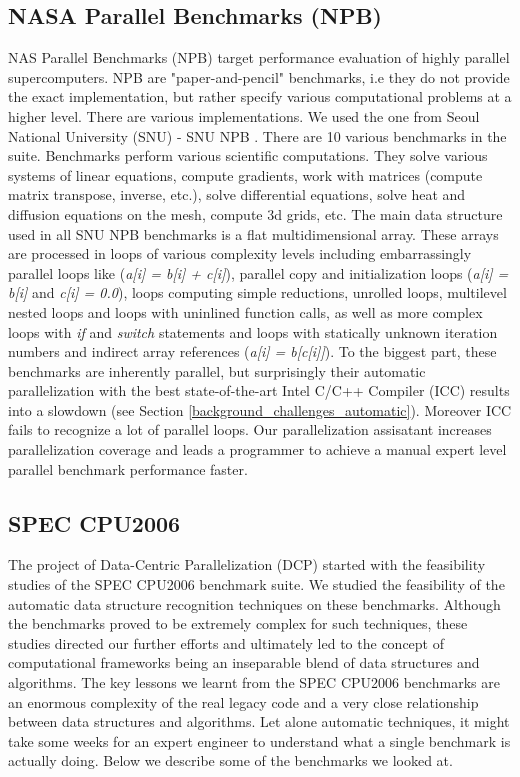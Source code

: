\subsection{NASA Parallel Benchmarks (NPB)}
\label{background_benchmarks_npb}
\quad NAS Parallel Benchmarks (NPB) \cite{nasa-parallel-benchmarks} target performance evaluation of highly parallel supercomputers. NPB are "paper-and-pencil" benchmarks, i.e they do not provide the exact implementation, but rather specify various computational problems at a higher level. There are various implementations. We used the one from Seoul National University (SNU) - SNU NPB \cite{snu-npb-benchmarks}.\newline\null
\quad There are 10 various benchmarks in the suite. Benchmarks perform various scientific computations. They solve various systems of linear equations, compute gradients, work with matrices (compute matrix transpose, inverse, etc.), solve differential equations, solve heat and diffusion equations on the mesh, compute 3d grids, etc. The main data structure used in all SNU NPB benchmarks is a flat multidimensional array. These arrays are processed in loops of various complexity levels including embarrassingly parallel loops like (\textit{a[i] = b[i] + c[i]}), parallel copy and initialization loops (\textit{a[i] = b[i]} and \textit{c[i] = 0.0}), loops computing simple reductions, unrolled loops, multilevel nested loops and loops with uninlined function calls, as well as more complex loops with \textit{if} and \textit{switch} statements and loops with statically unknown iteration numbers and indirect array references (\textit{a[i] = b[c[i]]}).\newline\null
\quad To the biggest part, these benchmarks are inherently parallel, but surprisingly their automatic parallelization with the best state-of-the-art Intel C/C++ Compiler (ICC) \cite{icc-compiler} results into a slowdown (see Section \ref{background_challenges_automatic}). Moreover ICC fails to recognize a lot of parallel loops. Our parallelization assisatant increases parallelization coverage and leads a programmer to achieve a manual expert level parallel benchmark performance faster. 
\subsection{SPEC CPU2006}
\label{background_benchmarks_spec}
\quad The project of Data-Centric Parallelization (DCP) started with the feasibility studies of the SPEC CPU2006 benchmark suite. We studied the feasibility of the automatic data structure recognition techniques on these benchmarks. Although the benchmarks proved to be extremely complex for such techniques, these studies directed our further efforts and ultimately led to the concept of computational frameworks being an inseparable blend of data structures and algorithms. The key lessons we learnt from the SPEC CPU2006 benchmarks are an enormous complexity of the real legacy code and a very close relationship between data structures and algorithms. Let alone automatic techniques, it might take some weeks for an expert engineer to understand what a single benchmark is actually doing. Below we describe some of the benchmarks we looked at.
